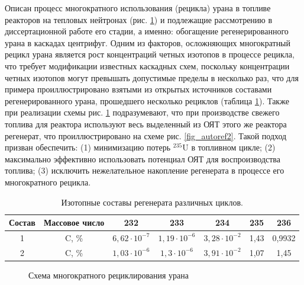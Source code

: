 Описан процесс многократного использования (рецикла) урана в топливе реакторов на тепловых нейтронах (рис. \ref{fig_autoref1}) и подлежащие рассмотрению в диссертационной работе его стадии, а именно: обогащение регенерированного урана в каскадах центрифуг. Одним из факторов, осложняющих многократный рецикл урана является рост концентраций четных изотопов в процессе рецикла, что требует модификации известных каскадных схем, поскольку концентрации четных изотопов могут превышать допустимые пределы в несколько раз, что для примера проиллюстрировано взятыми из открытых источников составами регенерированного урана, прошедшего несколько рециклов (таблица \ref{is_compositions_2_5autoref}). Также при реализации схемы рис. \ref{fig_autoref1} подразумевают, что при производстве свежего топлива для реактора используют весь выделенный из ОЯТ этого же реактора регенерат, что проиллюстрировано на схеме рис. \ref{fig_autoref2}.  Такой подход призван обеспечить: (1) минимизацию потерь  $^{235}$U в топливном цикле; (2) максимально эффективно использовать потенциал ОЯТ для воспроизводства топлива; (3) исключить нежелательное накопление регенерата в процессе его многократного рецикла.
\begin{table}[h]
  \centering
  \caption{{Изотопные составы регенерата различных циклов.{\label{is_compositions_2_5autoref}}}}
  \begin{tabular}{|c||c|c|c|c|c|c|}
  \hline Состав & Массовое число & 232 & 233 & 234 & 235 & 236 \\
  \hline 1 & C, \% & $6,62\cdot10^{-7}$ & $1,19\cdot10^{-6}$ & $3,28\cdot10^{-2}$ & 1,43 & 0,9932 \\
  2 & C, \% &  $1,03\cdot10^{-6}$ & $1,3\cdot10^{-6}$ & $3,91\cdot10^{-2}$ & 1,07 & 1,45 \\\hline
  \end{tabular}
\end{table}

\begin{figure}[ht]
  \caption{Схема многократного рециклирования урана}\label{fig_autoref1}
\end{figure}

